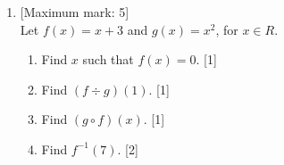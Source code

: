 \documentclass[12pt, twoside]{article}
\begin{document}
\begin{enumerate}
\newpage 
    \item {[Maximum mark: 5]} \\[0.3cm]
    Let $f(x)=x+3$ and $g(x)=x^2$, for $x \in R$.
        \begin{enumerate}
            \item Find $x$ such that $f(x)=0$. \hfill [1]
            \item Find $(f \div g)(1)$. \hfill [1]
            \item Find $(g \circ f)(x)$. \hfill [1]
            \item Find $f^{-1}(7)$. \hfill [2]
        \end{enumerate}

\end{enumerate}
\end{document}

